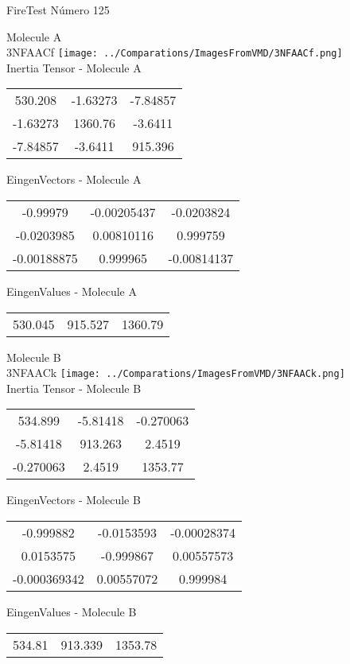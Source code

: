 \vtab[-2cm]
\begin{center}
{\large FireTest \tab Número 125}
\end{center}
\begin{multicols}{2}
\begin{center}

Molecule A \\ 
3NFAACf
\texttt{[image: ../Comparations/ImagesFromVMD/3NFAACf.png]}
\\
Inertia Tensor - Molecule A \\
\vtab

\begin{tabular}{|c c c|}
530.208	 & 	-1.63273	 & 	-7.84857	 \\
-1.63273	 & 	1360.76	 & 	-3.6411	 \\
-7.84857	 & 	-3.6411	 & 	915.396
\end{tabular}

\vtab
 EingenVectors - Molecule A     \\
\vtab
\begin{tabular}{|c c c|}
-0.99979	 & 	-0.00205437	 & 	-0.0203824	 \\
-0.0203985	 & 	0.00810116	 & 	0.999759	 \\
-0.00188875	 & 	0.999965	 & 	-0.00814137
\end{tabular}

\vtab
 EingenValues - Molecule A     \\
\vtab
\begin{tabular}{|c c c|}
530.045	 & 	915.527	 & 	1360.79	 \\
\end{tabular}
\columnbreak

Molecule B \\ 
3NFAACk
\texttt{[image: ../Comparations/ImagesFromVMD/3NFAACk.png]}
\\
Inertia Tensor - Molecule B \\
\vtab

\begin{tabular}{|c c c|}
534.899	 & 	-5.81418	 & 	-0.270063	 \\
-5.81418	 & 	913.263	 & 	2.4519	 \\
-0.270063	 & 	2.4519	 & 	1353.77
\end{tabular}

\vtab
 EingenVectors - Molecule B     \\
\vtab
\begin{tabular}{|c c c|}
-0.999882	 & 	-0.0153593	 & 	-0.00028374	 \\
0.0153575	 & 	-0.999867	 & 	0.00557573	 \\
-0.000369342	 & 	0.00557072	 & 	0.999984
\end{tabular}

\vtab
 EingenValues - Molecule B     \\
\vtab
\begin{tabular}{|c c c|}
534.81	 & 	913.339	 & 	1353.78	 \\
\end{tabular}

\end{center}
\end{multicols}
